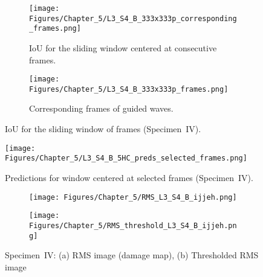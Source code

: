 \begin{figure} [!h]
	\centering
	\begin{subfigure}[b]{1\textwidth}
		\centering
		\texttt{[image: Figures/Chapter\_5/L3\_S4\_B\_333x333p\_corresponding\_frames.png]}
		\caption{IoU for the sliding window centered at consecutive frames.}
		\label{fig:L3_S4_B_333x333p_corresponding_frames}
	\end{subfigure}
	\par\medskip
	\begin{subfigure}[b]{1\textwidth}
		\centering
		\texttt{[image: Figures/Chapter\_5/L3\_S4\_B\_333x333p\_frames.png]}
		\caption{Corresponding frames of guided waves.} 
		\label{fig:L3_S4_B_333x333p_frames}
	\end{subfigure}
	\caption{IoU for the sliding window of frames (Specimen~IV).}
	\label{fig:L3_S4_B_333x333p_50kHz_5HC_IoU_centre_window}
\end{figure} 
\begin{figure}[!h]
	\centering
	\texttt{[image: Figures/Chapter\_5/L3\_S4\_B\_5HC\_preds\_selected\_frames.png]}
	\caption{Predictions for window centered at selected frames (Specimen~IV).}
	\label{fig:L3_S4_B_5HC_preds_selected_frames}
\end{figure}

\begin{figure} [!h]
	\begin{subfigure}[b]{.5\textwidth}
		\centering
		\texttt{[image: Figures/Chapter\_5/RMS\_L3\_S4\_B\_ijjeh.png]}
		\caption{} 
		\label{fig:RMS_L3_S4_B_ijjeh}
	\end{subfigure}
		\hfill
	\begin{subfigure}[b]{.42\textwidth}
		\centering
		\texttt{[image: Figures/Chapter\_5/RMS\_threshold\_L3\_S4\_B\_ijjeh.png]}
		\caption{} 
		\label{fig:RMS_threshold_L3_S4_B_ijjeh}
	\end{subfigure}
	\caption{Specimen~IV: (a) RMS image (damage map), (b) Thresholded RMS image}
	\label{fig:RMS_L3_S4_B__images}
\end{figure} 
\clearpage